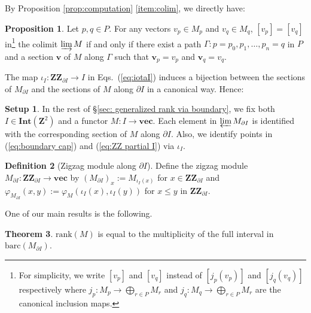 \documentclass[11pt]{article}
\theoremstyle{definition}
\newtheorem{theorem}{Theorem}[section]
\newtheorem{proposition}[theorem]{Proposition}
\newtheorem{definition}[theorem]{Definition}
\newtheorem{setup}[]{Setup}
\newcommand{\bv}{\mathbf{v}}
\newcommand{\ZZ}{\mathbf{ZZ}}
\newcommand{\rank}{\mathrm{rank}}
\newcommand{\Int}{\mathbf{Int}}
\newcommand{\vect}{\mathbf{vec}}
\newcommand{\Z}{\mathbf{Z}}
\newcommand{\barc}{\mathrm{barc}}
\begin{document}
By Proposition \ref{prop:computation} \ref{item:colim}, we directly have:
\begin{proposition}\label{prop:path characterization of zero in colim}
Let $p,q\in P$. For any vectors $v_{p}\in M_{p}$ and $v_q\in M_q$, $[v_{p}]=[v_q]$ in\footnote{For simplicity, we write $[v_{p}]$
 and $[v_q]$ instead of $[j_p(v_p)]$ and $[j_q(v_q)]$ respectively where $j_p:M_p\rightarrow \bigoplus_{r\in P}M_r$  and  $j_q:M_q\rightarrow \bigoplus_{r\in P}M_r$ are the canonical inclusion maps.} the colimit $\varinjlim M$ if and only if there exist a path $\Gamma:p=p_0,p_1,\ldots,p_n=q$ in $P$ and a section $\bv$ of $M$ along $\Gamma$ such that $\bv_{p}=v_{p}$ and $\bv_{q}=v_q$. 
\end{proposition}


The map $\iota_I:\ZZ_{\partial I}\rightarrow I$ in Eqs.~(\ref{eq:iotaI}) induces a bijection between the sections of $M_{\partial I}$  and the sections of $M$ along $\partial I$ in a canonical way. Hence:
\begin{framed}
\begin{setup}\label{setup in section 3}\label{setup:sections}
In the rest of \S\ref{sec: generalized rank via boundary}, we fix both $I\in\Int(\Z^2)$ and  a functor $M:I\rightarrow \vect$. Each element in $\varprojlim M_{\partial I}$  is identified with the corresponding section of $M$ along $\partial I$. Also, we identify points in  (\ref{eq:boundary cap}) and (\ref{eq:ZZ partial I}) via $\iota_I$.
\end{setup}
\end{framed}



\begin{definition}[Zigzag module along $\partial I$]\label{def:zigzag module along the boundary cap}
Define the zigzag module $M_{\partial I}:\ZZ_{\partial I}\rightarrow \vect$ by $(M_{\partial I})_x:=M_{\iota_I(x)}$ for $x\in \ZZ_{\partial I}$ and $\varphi_{M_{\partial I}}(x, y):=\varphi_{M}(\iota_I(x), \iota_I(y))$ for $x\leq y$ in $\ZZ_{\partial I}$.
\end{definition}

One of our main results is the following.

\begin{theorem}\label{thm:rank is the multiplicity of full intervals}
$\rank(M)$ is equal to the multiplicity of the full interval in $\barc(M_{\partial I})$.
\end{theorem}
\end{document}
